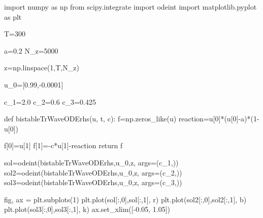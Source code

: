 \documentclass[
  letterpaper,
  DIV=11,
  numbers=noendperiod]{scrreprt}
\newenvironment{Shaded}{\begin{snugshade}}{\end{snugshade}}
\newcommand{\ControlFlowTok}[1]{\textcolor[rgb]{0.00,0.23,0.31}{#1}}
\newcommand{\DecValTok}[1]{\textcolor[rgb]{0.68,0.00,0.00}{#1}}
\newcommand{\FloatTok}[1]{\textcolor[rgb]{0.68,0.00,0.00}{#1}}
\newcommand{\ImportTok}[1]{\textcolor[rgb]{0.00,0.46,0.62}{#1}}
\newcommand{\KeywordTok}[1]{\textcolor[rgb]{0.00,0.23,0.31}{#1}}
\newcommand{\NormalTok}[1]{\textcolor[rgb]{0.00,0.23,0.31}{#1}}
\newcommand{\OperatorTok}[1]{\textcolor[rgb]{0.37,0.37,0.37}{#1}}
\newcommand{\StringTok}[1]{\textcolor[rgb]{0.13,0.47,0.30}{#1}}
\theoremstyle{plain}
\theoremstyle{definition}
\theoremstyle{plain}
\theoremstyle{remark}
\begin{document}
\begin{Shaded}
\begin{Highlighting}[]
\ImportTok{import}\NormalTok{ numpy }\ImportTok{as}\NormalTok{ np}
\ImportTok{from}\NormalTok{ scipy.integrate }\ImportTok{import}\NormalTok{ odeint}
\ImportTok{import}\NormalTok{ matplotlib.pyplot }\ImportTok{as}\NormalTok{ plt}

\NormalTok{T}\OperatorTok{=}\DecValTok{300}

\NormalTok{a}\OperatorTok{=}\FloatTok{0.2}
\NormalTok{N\_z}\OperatorTok{=}\DecValTok{5000}

\NormalTok{z}\OperatorTok{=}\NormalTok{np.linspace(}\DecValTok{1}\NormalTok{,T,N\_z)}

\NormalTok{u\_0}\OperatorTok{=}\NormalTok{[}\FloatTok{0.99}\NormalTok{,}\OperatorTok{{-}}\FloatTok{0.0001}\NormalTok{]}

\NormalTok{c\_1}\OperatorTok{=}\FloatTok{2.0}
\NormalTok{c\_2}\OperatorTok{=}\FloatTok{0.6}
\NormalTok{c\_3}\OperatorTok{=}\FloatTok{0.425}

\KeywordTok{def}\NormalTok{ bistableTrWaveODErhs(u, t, c):}
\NormalTok{    f}\OperatorTok{=}\NormalTok{np.zeros\_like(u)}
\NormalTok{    reaction}\OperatorTok{=}\NormalTok{u[}\DecValTok{0}\NormalTok{]}\OperatorTok{*}\NormalTok{(u[}\DecValTok{0}\NormalTok{]}\OperatorTok{{-}}\NormalTok{a)}\OperatorTok{*}\NormalTok{(}\DecValTok{1}\OperatorTok{{-}}\NormalTok{u[}\DecValTok{0}\NormalTok{]) }

\NormalTok{    f[}\DecValTok{0}\NormalTok{]}\OperatorTok{=}\NormalTok{u[}\DecValTok{1}\NormalTok{]}
\NormalTok{    f[}\DecValTok{1}\NormalTok{]}\OperatorTok{={-}}\NormalTok{c}\OperatorTok{*}\NormalTok{u[}\DecValTok{1}\NormalTok{]}\OperatorTok{{-}}\NormalTok{reaction}
    \ControlFlowTok{return}\NormalTok{ f  }

\NormalTok{sol}\OperatorTok{=}\NormalTok{odeint(bistableTrWaveODErhs,u\_0,z, args}\OperatorTok{=}\NormalTok{(c\_1,))}
\NormalTok{sol2}\OperatorTok{=}\NormalTok{odeint(bistableTrWaveODErhs,u\_0,z, args}\OperatorTok{=}\NormalTok{(c\_2,))}
\NormalTok{sol3}\OperatorTok{=}\NormalTok{odeint(bistableTrWaveODErhs,u\_0,z, args}\OperatorTok{=}\NormalTok{(c\_3,))}

\NormalTok{fig, ax }\OperatorTok{=}\NormalTok{ plt.subplots(}\DecValTok{1}\NormalTok{)}
\NormalTok{plt.plot(sol[:,}\DecValTok{0}\NormalTok{],sol[:,}\DecValTok{1}\NormalTok{], }\StringTok{\textquotesingle{}r\textquotesingle{}}\NormalTok{)}
\NormalTok{plt.plot(sol2[:,}\DecValTok{0}\NormalTok{],sol2[:,}\DecValTok{1}\NormalTok{], }\StringTok{\textquotesingle{}b\textquotesingle{}}\NormalTok{)}
\NormalTok{plt.plot(sol3[:,}\DecValTok{0}\NormalTok{],sol3[:,}\DecValTok{1}\NormalTok{], }\StringTok{\textquotesingle{}k\textquotesingle{}}\NormalTok{)}
\NormalTok{ax.set\_xlim([}\OperatorTok{{-}}\FloatTok{0.05}\NormalTok{, }\FloatTok{1.05}\NormalTok{])}


\end{Highlighting}
\end{Shaded}
\end{document}
